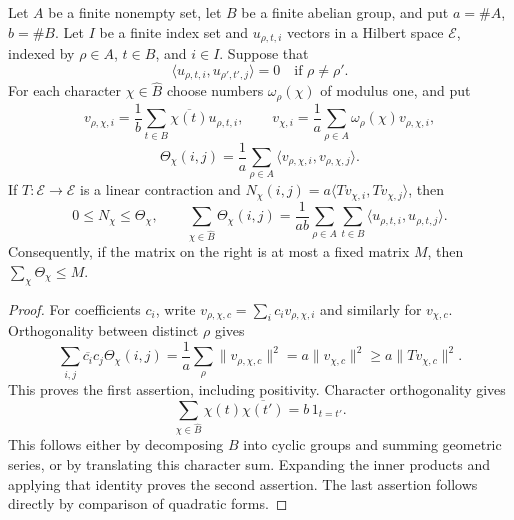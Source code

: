 \begin{proposition}\label{th-fourier-average}
Let $A$ be a finite nonempty set, let $B$ be a finite abelian group,
and put $a=\#A$, $b=\#B$.  Let $I$ be a finite index set and
$u_{\rho,t,i}$ vectors in a Hilbert space $\mathcal E$, indexed by
$\rho\in A$, $t\in B$, and $i\in I$.  Suppose that
\[
 \langle u_{\rho,t,i},u_{\rho',t',j}\rangle=0
 \quad\text{if }\rho\ne\rho'.
\]
For each character $\chi\in\widehat B$ choose numbers
$\omega_\rho(\chi)$ of modulus one, and put
\[
 v_{\rho,\chi,i}=\frac1b\sum_{t\in B}
             \overline{\chi(t)}u_{\rho,t,i},\qquad
 v_{\chi,i}=\frac1a\sum_{\rho\in A}
             \omega_\rho(\chi)v_{\rho,\chi,i},
\]
\[
 \Theta_\chi(i,j)=\frac1a\sum_{\rho\in A}
          \langle v_{\rho,\chi,i},v_{\rho,\chi,j}\rangle.
\]
If $T:\mathcal E\to\mathcal E$ is a linear contraction and
$N_\chi(i,j)=a\langle Tv_{\chi,i},Tv_{\chi,j}\rangle$, then
\begin{equation}\label{th-fourier-domination}
 0\le N_\chi\le\Theta_\chi,
 \qquad
 \sum_{\chi\in\widehat B}\Theta_\chi(i,j)
 =\frac1{ab}\sum_{\rho\in A}\sum_{t\in B}
       \langle u_{\rho,t,i},u_{\rho,t,j}\rangle.
\end{equation}
Consequently, if the matrix on the right is at most a fixed matrix
$M$, then $\sum_\chi\Theta_\chi\le M$.
\end{proposition}

\begin{proof}
For coefficients $c_i$, write
$v_{\rho,\chi,c}=\sum_i c_i v_{\rho,\chi,i}$ and similarly
for $v_{\chi,c}$.  Orthogonality between distinct $\rho$ gives
\[
 \sum_{i,j}\overline{c_i}c_j\Theta_\chi(i,j)
 =\frac1a\sum_\rho\|v_{\rho,\chi,c}\|^2
 =a\|v_{\chi,c}\|^2
 \ge a\|Tv_{\chi,c}\|^2.
\]
This proves the first assertion, including positivity.  Character
orthogonality gives
\[
 \sum_{\chi\in\widehat B}\chi(t)\overline{\chi(t')}
 =b\,1_{t=t'}.
\]
This follows either by decomposing $B$ into cyclic
groups and summing geometric series, or by translating this
character sum.  Expanding the inner products and applying that
identity proves the second assertion.  The last assertion follows
directly by comparison of quadratic forms.
\end{proof}

